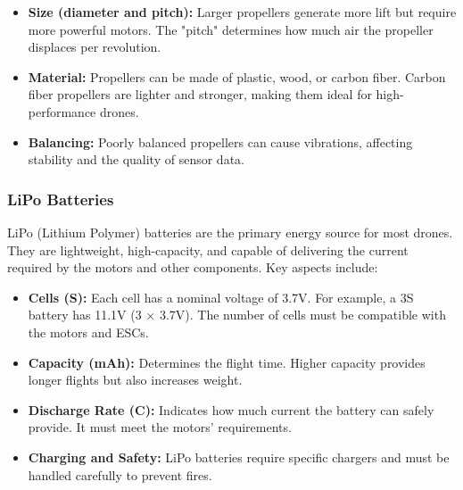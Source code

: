     \begin{itemize}
        \item \textbf{Size (diameter and pitch):} Larger propellers generate more lift but require more powerful motors. The "pitch" determines how much air the propeller displaces per revolution.
        \item \textbf{Material:} Propellers can be made of plastic, wood, or carbon fiber. Carbon fiber propellers are lighter and stronger, making them ideal for high-performance drones.
        \item \textbf{Balancing:} Poorly balanced propellers can cause vibrations, affecting stability and the quality of sensor data.
    \end{itemize}
    
    \subsubsection{LiPo Batteries}
    
    LiPo (Lithium Polymer) batteries are the primary energy source for most drones. They are lightweight, high-capacity, and capable of delivering the current required by the motors and other components. Key aspects include:
    
    \begin{itemize}
        \item \textbf{Cells (S):} Each cell has a nominal voltage of 3.7V. For example, a 3S battery has 11.1V (3 × 3.7V). The number of cells must be compatible with the motors and ESCs.
        \item \textbf{Capacity (mAh):} Determines the flight time. Higher capacity provides longer flights but also increases weight.
        \item \textbf{Discharge Rate (C):} Indicates how much current the battery can safely provide. It must meet the motors' requirements.
        \item \textbf{Charging and Safety:} LiPo batteries require specific chargers and must be handled carefully to prevent fires.
    \end{itemize}
    
    
    
    


